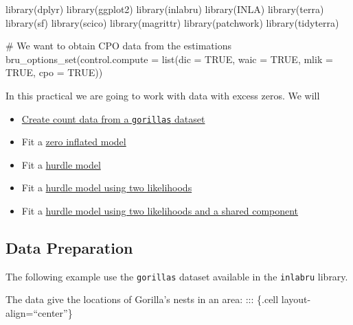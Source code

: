 \documentclass[
  letterpaper,
  DIV=11,
  numbers=noendperiod]{scrartcl}
\newenvironment{Shaded}{\begin{snugshade}}{\end{snugshade}}
\newcommand{\AttributeTok}[1]{\textcolor[rgb]{0.40,0.45,0.13}{#1}}
\newcommand{\CommentTok}[1]{\textcolor[rgb]{0.37,0.37,0.37}{#1}}
\newcommand{\ConstantTok}[1]{\textcolor[rgb]{0.56,0.35,0.01}{#1}}
\newcommand{\FunctionTok}[1]{\textcolor[rgb]{0.28,0.35,0.67}{#1}}
\newcommand{\NormalTok}[1]{\textcolor[rgb]{0.00,0.23,0.31}{#1}}
\begin{document}
\begin{Shaded}
\begin{Highlighting}[]
\FunctionTok{library}\NormalTok{(dplyr)}
\FunctionTok{library}\NormalTok{(ggplot2)}
\FunctionTok{library}\NormalTok{(inlabru)}
\FunctionTok{library}\NormalTok{(INLA)}
\FunctionTok{library}\NormalTok{(terra)}
\FunctionTok{library}\NormalTok{(sf)}
\FunctionTok{library}\NormalTok{(scico)}
\FunctionTok{library}\NormalTok{(magrittr)}
\FunctionTok{library}\NormalTok{(patchwork)}
\FunctionTok{library}\NormalTok{(tidyterra)}


\CommentTok{\# We want to obtain CPO data from the estimations}
\FunctionTok{bru\_options\_set}\NormalTok{(}\AttributeTok{control.compute =} \FunctionTok{list}\NormalTok{(}\AttributeTok{dic =} \ConstantTok{TRUE}\NormalTok{,}
                                       \AttributeTok{waic =} \ConstantTok{TRUE}\NormalTok{,}
                                       \AttributeTok{mlik =} \ConstantTok{TRUE}\NormalTok{,}
                                       \AttributeTok{cpo =} \ConstantTok{TRUE}\NormalTok{))}
\end{Highlighting}
\end{Shaded}

In this practical we are going to work with data with excess zeros. We
will

\begin{itemize}
\item
  \hyperref[sec-prep]{Create count data from a \texttt{gorillas}
  dataset}
\item
  Fit a \hyperref[sec-zip]{zero inflated model}
\item
  Fit a \hyperref[sec-zap]{hurdle model}
\item
  Fit a \hyperref[sec-two-lik]{hurdle model using two likelihoods}
\item
  Fit a \hyperref[sec-two-lik-share]{hurdle model using two likelihoods
  and a shared component}
\end{itemize}

\subsection{Data Preparation}\label{sec-prep}

The following example use the \texttt{gorillas} dataset available in the
\texttt{inlabru} library.

The data give the locations of Gorilla's nests in an area: ::: \{.cell
layout-align=``center''\}
\end{document}
